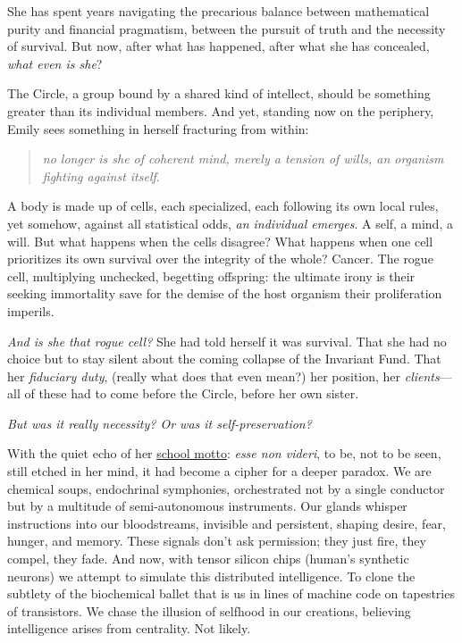 \smallskip


She has spent years navigating the precarious balance between mathematical purity and financial pragmatism, between the pursuit of truth and the necessity of survival. But now, after what has happened, after what she has concealed, \textit{what even is she}?

\smallskip

The Circle, a group bound by a shared kind of intellect, should be something greater than its individual members. And yet, standing now on the periphery, Emily sees something in herself fracturing from within:

\begin{quote}
\textit{no longer is she of coherent mind, merely a tension of wills, an organism fighting against itself}. 
\end {quote}

\smallskip

A body is made up of cells, each specialized, each following its own local rules, yet somehow, against all statistical odds, \textit{an individual emerges}. A self, a mind, a will. But what happens when the cells disagree? What happens when one cell prioritizes its own survival over the integrity of the whole? Cancer. The rogue cell, multiplying unchecked, begetting offspring: the ultimate irony is their seeking immortality save for the demise of the host organism their proliferation imperils.

\smallskip

\textit{And is she that rogue cell?} She had told herself it was survival. That she had no choice but to stay silent about the coming collapse of the Invariant Fund. That her \textit{fiduciary duty}, (really what does that even mean?) her position, her \textit{clients}—all of these had to come before the Circle, before her own sister.

\smallskip

\textit{But was it really necessity? Or was it self-preservation?}

With the quiet echo of her \href{https://kingsoakacademy.clf.uk/our-academy/kingswood-old-scholars-association/}{school motto}: \textit{esse non videri}, to be, not to be seen, still etched in her mind, it had become a cipher for a deeper paradox. We are chemical soups, endochrinal symphonies, orchestrated not by a single conductor but by a multitude of semi-autonomous instruments. Our glands whisper instructions into our bloodstreams, invisible and persistent, shaping desire, fear, hunger, and memory. These signals don’t ask permission; they just fire, they compel, they fade. And now, with tensor silicon chips (human's synthetic neurons) we attempt to simulate this distributed intelligence. To clone the subtlety of the biochemical ballet that is us in lines of machine code on tapestries of transistors. We chase the illusion of selfhood in our creations, believing intelligence arises from centrality. Not likely.

